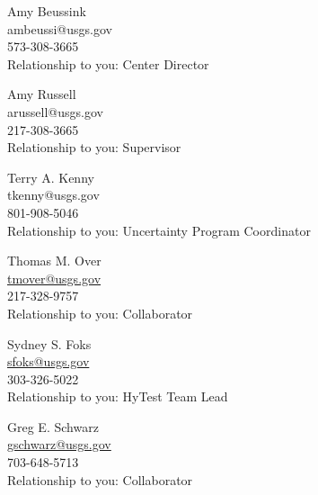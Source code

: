 \documentclass[12pt]{article}
\begin{document}
\begin{multicols}{2}
\raggedright

Amy Beussink\\
ambeussi@usgs.gov \\
573-308-3665 \\
Relationship to you: Center Director

\vspace{10pt}

Amy Russell\\
arussell@usgs.gov \\
217-308-3665\\
Relationship to you: Supervisor

\vspace{10pt}

Terry A. Kenny\\
tkenny@usgs.gov  \\
801-908-5046\\
Relationship to you: Uncertainty Program Coordinator

\vspace{10pt}

Thomas M. Over\\
\url{tmover@usgs.gov}\\
217-328-9757\\
Relationship to you: Collaborator

\vspace{10pt}

Sydney S. Foks\\
\url{sfoks@usgs.gov} \\
303-326-5022\\
Relationship to you: HyTest Team Lead

\vspace{10pt}
Greg E. Schwarz\\
\url{gschwarz@usgs.gov}\\
703-648-5713\\
Relationship to you: Collaborator


\end{multicols}
\end{document}
